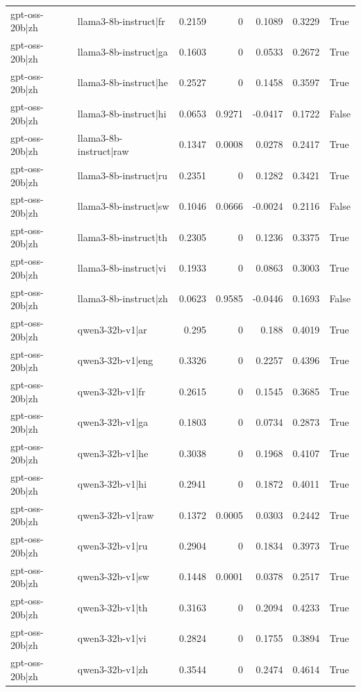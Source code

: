 \begin{table}
\begin{tabular}{l l r r r r l}
gpt-oss-20b|zh & llama3-8b-instruct|fr & 0.2159 & 0 & 0.1089 & 0.3229 & True \\
gpt-oss-20b|zh & llama3-8b-instruct|ga & 0.1603 & 0 & 0.0533 & 0.2672 & True \\
gpt-oss-20b|zh & llama3-8b-instruct|he & 0.2527 & 0 & 0.1458 & 0.3597 & True \\
gpt-oss-20b|zh & llama3-8b-instruct|hi & 0.0653 & 0.9271 & -0.0417 & 0.1722 & False \\
gpt-oss-20b|zh & llama3-8b-instruct|raw & 0.1347 & 0.0008 & 0.0278 & 0.2417 & True \\
gpt-oss-20b|zh & llama3-8b-instruct|ru & 0.2351 & 0 & 0.1282 & 0.3421 & True \\
gpt-oss-20b|zh & llama3-8b-instruct|sw & 0.1046 & 0.0666 & -0.0024 & 0.2116 & False \\
gpt-oss-20b|zh & llama3-8b-instruct|th & 0.2305 & 0 & 0.1236 & 0.3375 & True \\
gpt-oss-20b|zh & llama3-8b-instruct|vi & 0.1933 & 0 & 0.0863 & 0.3003 & True \\
gpt-oss-20b|zh & llama3-8b-instruct|zh & 0.0623 & 0.9585 & -0.0446 & 0.1693 & False \\
gpt-oss-20b|zh & qwen3-32b-v1|ar & 0.295 & 0 & 0.188 & 0.4019 & True \\
gpt-oss-20b|zh & qwen3-32b-v1|eng & 0.3326 & 0 & 0.2257 & 0.4396 & True \\
gpt-oss-20b|zh & qwen3-32b-v1|fr & 0.2615 & 0 & 0.1545 & 0.3685 & True \\
gpt-oss-20b|zh & qwen3-32b-v1|ga & 0.1803 & 0 & 0.0734 & 0.2873 & True \\
gpt-oss-20b|zh & qwen3-32b-v1|he & 0.3038 & 0 & 0.1968 & 0.4107 & True \\
gpt-oss-20b|zh & qwen3-32b-v1|hi & 0.2941 & 0 & 0.1872 & 0.4011 & True \\
gpt-oss-20b|zh & qwen3-32b-v1|raw & 0.1372 & 0.0005 & 0.0303 & 0.2442 & True \\
gpt-oss-20b|zh & qwen3-32b-v1|ru & 0.2904 & 0 & 0.1834 & 0.3973 & True \\
gpt-oss-20b|zh & qwen3-32b-v1|sw & 0.1448 & 0.0001 & 0.0378 & 0.2517 & True \\
gpt-oss-20b|zh & qwen3-32b-v1|th & 0.3163 & 0 & 0.2094 & 0.4233 & True \\
gpt-oss-20b|zh & qwen3-32b-v1|vi & 0.2824 & 0 & 0.1755 & 0.3894 & True \\
gpt-oss-20b|zh & qwen3-32b-v1|zh & 0.3544 & 0 & 0.2474 & 0.4614 & True \\

\end{tabular}
\end{table}
